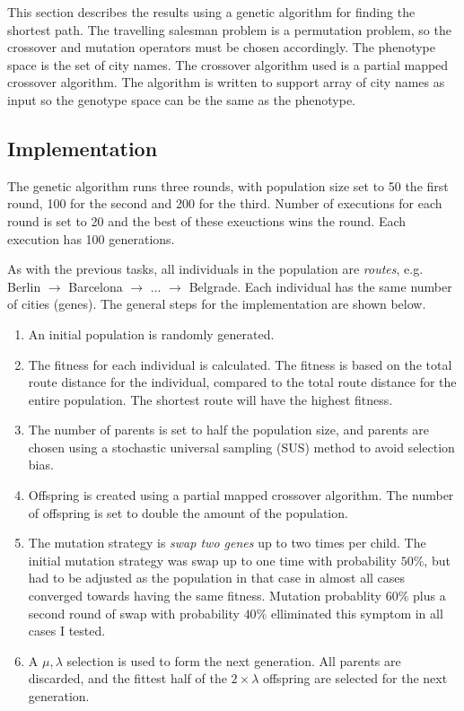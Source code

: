 \documentclass{article}
\begin{document}
This section describes the results using a genetic algorithm for finding the shortest path. The travelling salesman problem is a permutation problem, so the crossover and mutation operators must be chosen accordingly. The phenotype space is the set of city names. The crossover algorithm used is a partial mapped crossover algorithm. The algorithm is written to support array of city names as input so the genotype space can be the same as the phenotype.

\subsection*{Implementation}

The genetic algorithm runs three rounds, with population size set to 50 the first round, 100 for the second and 200 for the third. Number of executions for each round is set to 20 and the best of these exeuctions wins the round. Each execution has 100 generations.

As with the previous tasks, all individuals in the population are \textit{routes}, e.g. Berlin $\rightarrow$ Barcelona $\rightarrow$ $\ldots$ $\rightarrow$ Belgrade. Each individual has the same number of cities (genes). The general steps for the implementation are shown below.

\begin{enumerate}
    \item An initial population is randomly generated.
    \item The fitness for each individual is calculated. The fitness is based on the total route distance for the individual, compared to the total route distance for the entire population. The shortest route will have the highest fitness.
    \item The number of parents is set to half the population size, and parents are chosen using a stochastic universal sampling (SUS) method to avoid selection bias.
    \item Offspring is created using a partial mapped crossover algorithm. The number of offspring is set to double the amount of the population.
    \item The mutation strategy is \textit{swap two genes} up to two times per child. The initial mutation strategy was swap up to one time with probability $50\%$, but had to be adjusted as the population in that case in almost all cases converged towards having the same fitness. Mutation probablity $60\%$ plus a second round of swap with probability $40\%$ elliminated this symptom in all cases I tested.
    \item A $\mu,\lambda$ selection is used to form the next generation. All parents are discarded, and the fittest half of the $2 \times \lambda$ offspring are selected for the next generation.
\end{enumerate}
\end{document}
